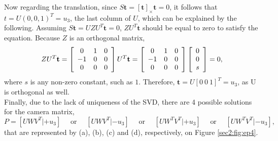 Now regarding the translation, since $S \mathbf{t} = [\mathbf{t}]_{\times}\mathbf{t} = 0$, it follows that $t = U (0, 0, 1)^T = u_3$, the last column of $U$, which can be explained by the following. Assuming $S \mathbf{t} = U Z U^T \mathbf{t} = 0$, $Z U^T \mathbf{t}$ should be equal to zero to satisfy the equation. Because $Z$ is an orthogonal matrix,
\begin{equation}
Z U^T \mathbf{t} = \left[ \begin{array} { c c c } { 0 } & { 1 } & { 0 } \\ { - 1 } & { 0 } & { 0 } \\ { 0 } & { 0 } & { 0 } \end{array} \right] U^T \mathbf{t}  = \left[ \begin{array} { c c c } { 0 } & { 1 } & { 0 } \\ { - 1 } & { 0 } & { 0 } \\ { 0 } & { 0 } & { 0 } \end{array} \right] \left[ \begin{array} { c } { 0 } \\ { 0} \\ s \end{array} \right] = 0,
\end{equation}
where $s$ is any non-zero constant, such as $1$. Therefore, $\mathbf{t} = U [0 \ 0 \ 1]^T = u_3$, as U is orthogonal as well.\\
Finally, due to the lack of uniqueness of the SVD, there are 4 possible solutions for the camera matrix,
\begin{equation}
P = \left[UWV^T | + u_{ 3 } \right] \quad \text { or } \quad \left[ UWV^T | - u_ { 3 } \right] \quad \text { or } \quad \left[ UW^T V^T | + u_ { 3 } \right] \quad \text { or } \quad \left[ UW^T V^T |- u _ { 3 } \right],
\end{equation}
that are represented by (a), (b), (c) and (d), respectively, on Figure \ref{sec2:fig:ep4}. 

